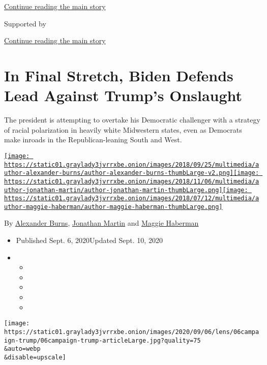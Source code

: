 \protect\hyperlink{after-top}{Continue reading the main story}

Supported by

\protect\hyperlink{after-sponsor}{Continue reading the main story}

\hypertarget{in-final-stretch-biden-defends-lead-against-trumps-onslaught}{%
\section{In Final Stretch, Biden Defends Lead Against Trump's
Onslaught}\label{in-final-stretch-biden-defends-lead-against-trumps-onslaught}}

The president is attempting to overtake his Democratic challenger with a
strategy of racial polarization in heavily white Midwestern states, even
as Democrats make inroads in the Republican-leaning South and West.

\href{https://www.nytimes3xbfgragh.onion/by/alexander-burns}{\texttt{[image: https://static01.graylady3jvrrxbe.onion/images/2018/09/25/multimedia/author-alexander-burns/author-alexander-burns-thumbLarge-v2.png]}}\href{https://www.nytimes3xbfgragh.onion/by/jonathan-martin}{\texttt{[image: https://static01.graylady3jvrrxbe.onion/images/2018/11/06/multimedia/author-jonathan-martin/author-jonathan-martin-thumbLarge.png]}}\href{https://www.nytimes3xbfgragh.onion/by/maggie-haberman}{\texttt{[image: https://static01.graylady3jvrrxbe.onion/images/2018/07/12/multimedia/author-maggie-haberman/author-maggie-haberman-thumbLarge.png]}}

By
\href{https://www.nytimes3xbfgragh.onion/by/alexander-burns}{Alexander
Burns},
\href{https://www.nytimes3xbfgragh.onion/by/jonathan-martin}{Jonathan
Martin} and
\href{https://www.nytimes3xbfgragh.onion/by/maggie-haberman}{Maggie
Haberman}

\begin{itemize}
\item
  Published Sept. 6, 2020Updated Sept. 10, 2020
\item
  \begin{itemize}
  \item
  \item
  \item
  \item
  \item
  \end{itemize}
\end{itemize}

\texttt{[image: https://static01.graylady3jvrrxbe.onion/images/2020/09/06/lens/06campaign-trump/06campaign-trump-articleLarge.jpg?quality=75\\\&auto=webp\\\&disable=upscale]}


